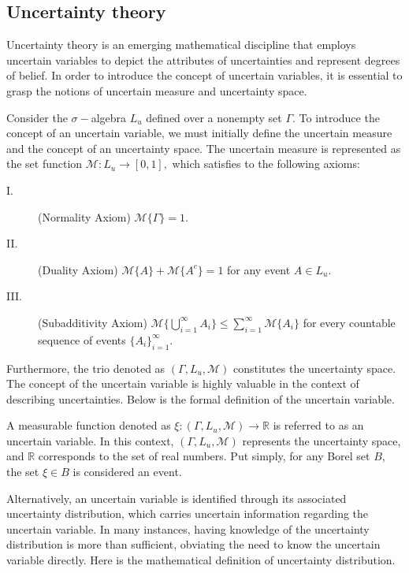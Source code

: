 \subsection{Uncertainty theory} 
 Uncertainty theory is an emerging mathematical discipline that employs uncertain variables to depict the attributes of uncertainties and represent degrees of belief. In order to introduce the concept of uncertain variables, it is essential to grasp the notions of uncertain measure and uncertainty space.
\begin{definition}\cite{Liu 2015}\label{def.5}
	Consider the $\sigma-$algebra $L_u$ defined over a nonempty set $\Gamma$. To introduce the concept of an uncertain variable, we must initially define the uncertain measure and the concept of an uncertainty space. The uncertain measure is represented as the set function $\mathcal{M}:L_u\rightarrow[0,1],$ which satisfies to the following axioms:
	\begin{description}
		\item[I.] (Normality Axiom) $\mathcal{M}\{\Gamma\}=1$.
		\item[II.] (Duality Axiom) $\mathcal{M}\{A\}+\mathcal{M}\{A^c\}=1$ for any event $A\in L_u$.
		\item[III.] (Subadditivity Axiom) $\mathcal{M}\big\{ \bigcup\limits_{i=1}^{\infty}A_i \big\} \leq \sum\limits_{i=1}^{\infty}\mathcal{M}\{A_i\}$ for every countable sequence of events $\{A_i\}_{i=1}^{\infty}$.
	\end{description}
\end{definition}
\par Furthermore, the trio denoted as $(\Gamma,L_u,\mathcal{M})$ constitutes the uncertainty space. The concept of the uncertain variable is highly valuable in the context of describing uncertainties. Below is the formal definition of the uncertain variable.
\begin{definition}\cite{Liu 2015}\label{def.6}
	A measurable function denoted as $\xi:(\Gamma,L_u,\mathcal{M})\to \mathbb{R}$ is referred to as an uncertain variable. In this context, $(\Gamma,L_u,\mathcal{M})$ represents the uncertainty space, and $\mathbb{R}$ corresponds to the set of real numbers. Put simply, for any Borel set $B$, the set ${\xi\in B}$ is considered an event.
\end{definition}
\par Alternatively, an uncertain variable is identified through its associated uncertainty distribution, which carries uncertain information regarding the uncertain variable. In many instances, having knowledge of the uncertainty distribution is more than sufficient, obviating the need to know the uncertain variable directly. Here is the mathematical definition of uncertainty distribution.
